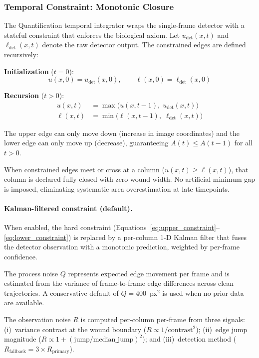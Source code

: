 \subsubsection{Temporal Constraint: Monotonic Closure}

The Quantification temporal integrator wraps the single-frame detector with a stateful constraint that enforces the biological axiom. Let $u_\text{det}(x, t)$ and $\ell_\text{det}(x, t)$ denote the raw detector output. The constrained edges are defined recursively:

\textbf{Initialization} ($t = 0$):
\begin{equation}
  u(x, 0) = u_\text{det}(x, 0), \qquad \ell(x, 0) = \ell_\text{det}(x, 0)
\end{equation}

\textbf{Recursion} ($t > 0$):
\begin{align}
  u(x, t) &= \max\bigl(u(x, t-1),\; u_\text{det}(x, t)\bigr) \label{eq:upper_constraint}\\
  \ell(x, t) &= \min\bigl(\ell(x, t-1),\; \ell_\text{det}(x, t)\bigr) \label{eq:lower_constraint}
\end{align}

The upper edge can only move down (increase in image coordinates) and the lower edge can only move up (decrease), guaranteeing $A(t) \leq A(t-1)$ for all $t > 0$.

When constrained edges meet or cross at a column ($u(x,t) \geq \ell(x,t)$), that column is declared fully closed with zero wound width. No artificial minimum gap is imposed, eliminating systematic area overestimation at late timepoints.

\paragraph{Kalman-filtered constraint (default).}
When enabled, the hard constraint (Equations~\ref{eq:upper_constraint}--\ref{eq:lower_constraint}) is replaced by a per-column 1-D Kalman filter that fuses the detector observation with a monotonic prediction, weighted by per-frame confidence.

The process noise $Q$ represents expected edge movement per frame and is estimated from the variance of frame-to-frame edge differences across clean trajectories. A conservative default of $Q = 400$~px$^2$ is used when no prior data are available.

The observation noise $R$ is computed per-column per-frame from three signals: (i)~variance contrast at the wound boundary ($R \propto 1/\text{contrast}^2$); (ii)~edge jump magnitude ($R \propto 1 + (\text{jump}/\text{median\_jump})^2$); and (iii)~detection method ($R_\text{fallback} = 3 \times R_\text{primary}$).

